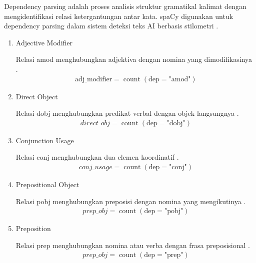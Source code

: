 Dependency parsing adalah proses analisis struktur gramatikal kalimat dengan mengidentifikasi relasi ketergantungan antar kata. spaCy digunakan untuk dependency parsing dalam sistem deteksi teks AI berbasis stilometri \cite{Jaashan2025}\cite{Of2026}.

\begin{enumerate}[label=\arabic*., leftmargin=*]
  \item Adjective Modifier
  
  Relasi amod menghubungkan adjektiva dengan nomina yang dimodifikasinya \cite{Jaashan2025}.
  \begin{equation}
  \label{eq:11}
  \begin{split}
\mathrm{adj}\_\mathrm{modifier}=\operatorname{count}{\left(\mathrm{dep}=\text{"amod"}\right)}
  \end{split}
  \end{equation}

  \item Direct Object
  
  Relasi dobj menghubungkan predikat verbal dengan objek langsungnya \cite{Jaashan2025}.
  \begin{equation}
  \label{eq:12}
  \begin{split}
direct\_obj=\operatorname{count}{\left(\mathrm{dep}=\text{"dobj"}\right)}
  \end{split}
  \end{equation}

  \item Conjunction Usage
  
  Relasi conj menghubungkan dua elemen koordinatif \cite{Jaashan2025}.
  \begin{equation}
  \label{eq:13}
  \begin{split}
conj\_usage=\operatorname{count}{\left(\mathrm{dep}=\text{"conj"}\right)}
  \end{split}
  \end{equation}
  
  \item Prepositional Object
  
  Relasi pobj menghubungkan preposisi dengan nomina yang mengikutinya \cite{Jaashan2025}.
  \begin{equation}
  \label{eq:14}
  \begin{split}
prep\_obj=\operatorname{count}{\left(\mathrm{dep}=\text{"pobj"}\right)}
  \end{split}
  \end{equation}
  
  \item Preposition
  
  Relasi prep menghubungkan nomina atau verba dengan frasa preposisional \cite{Of2026}.
  \begin{equation}
  \label{eq:15}
  \begin{split}
prep\_obj=\operatorname{count}{\left(\mathrm{dep}=\text{"prep"}\right)}
  \end{split}
  \end{equation}
  
\end{enumerate}

